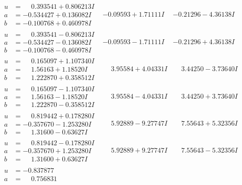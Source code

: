 \documentclass[1p]{elsarticle_modified}
\theoremstyle{definition}
\begin{document}
$$\begin{array}{c|c|c}
\begin{aligned}
u &= \phantom{-}0.393541 + 0.806213 I \\
a &= -0.534427 + 0.136082 I \\
b &= -0.100768 + 0.460978 I\end{aligned}
 & -0.09593 + 1.71111 I & -0.21296 - 4.36138 I \\ \hline\begin{aligned}
u &= \phantom{-}0.393541 - 0.806213 I \\
a &= -0.534427 - 0.136082 I \\
b &= -0.100768 - 0.460978 I\end{aligned}
 & -0.09593 - 1.71111 I & -0.21296 + 4.36138 I \\ \hline\begin{aligned}
u &= \phantom{-}0.165097 + 1.107340 I \\
a &= \phantom{-}1.56163 + 1.18520 I \\
b &= \phantom{-}1.222870 + 0.358512 I\end{aligned}
 & \phantom{-}3.95584 + 4.04331 I & \phantom{-}3.44250 - 3.73640 I \\ \hline\begin{aligned}
u &= \phantom{-}0.165097 - 1.107340 I \\
a &= \phantom{-}1.56163 - 1.18520 I \\
b &= \phantom{-}1.222870 - 0.358512 I\end{aligned}
 & \phantom{-}3.95584 - 4.04331 I & \phantom{-}3.44250 + 3.73640 I \\ \hline\begin{aligned}
u &= \phantom{-}0.819442 + 0.178280 I \\
a &= -0.357670 - 1.253280 I \\
b &= \phantom{-}1.31600 - 0.63627 I\end{aligned}
 & \phantom{-}5.92889 - 9.27747 I & \phantom{-}7.55643 + 5.32356 I \\ \hline\begin{aligned}
u &= \phantom{-}0.819442 - 0.178280 I \\
a &= -0.357670 + 1.253280 I \\
b &= \phantom{-}1.31600 + 0.63627 I\end{aligned}
 & \phantom{-}5.92889 + 9.27747 I & \phantom{-}7.55643 - 5.32356 I \\ \hline\begin{aligned}
u &= -0.837877\phantom{ +0.000000I} \\
a &= \phantom{-}0.756831\phantom{ +0.000000I} \\

\end{aligned}
\end{array}$$
\end{document}
